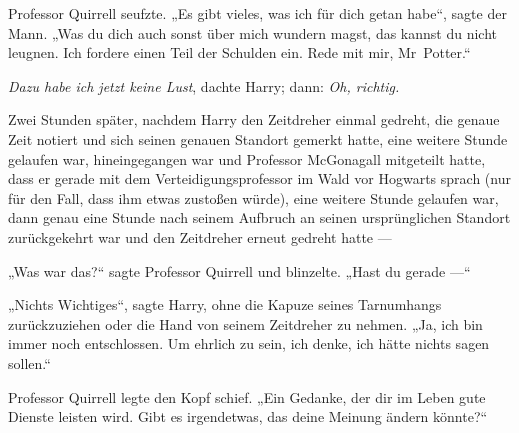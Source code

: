 Professor Quirrell seufzte.
„Es gibt vieles, was ich für dich getan habe“, sagte der Mann.
„Was du dich auch sonst über mich wundern magst, das kannst du nicht leugnen. Ich fordere einen Teil der Schulden ein. Rede mit mir, Mr~Potter.“

\emph{Dazu habe ich jetzt keine Lust}, dachte Harry; dann: \emph{Oh, richtig.}

\later

Zwei Stunden später, nachdem Harry den Zeitdreher einmal gedreht, die genaue Zeit notiert und sich seinen genauen Standort gemerkt hatte, eine weitere Stunde gelaufen war, hineingegangen war und Professor McGonagall mitgeteilt hatte, dass er gerade mit dem Verteidigungsprofessor im Wald vor Hogwarts sprach (nur für den Fall, dass ihm etwas zustoßen würde), eine weitere Stunde gelaufen war, dann genau eine Stunde nach seinem Aufbruch an seinen ursprünglichen Standort zurückgekehrt war und den Zeitdreher erneut gedreht hatte —

\later

„Was war das?“ sagte Professor Quirrell und blinzelte.
„Hast du gerade —“

„Nichts Wichtiges“, sagte Harry, ohne die Kapuze seines Tarnumhangs zurückzuziehen oder die Hand von seinem Zeitdreher zu nehmen.
„Ja, ich bin immer noch entschlossen. Um ehrlich zu sein, ich denke, ich hätte nichts sagen sollen.“

Professor Quirrell legte den Kopf schief.
„Ein Gedanke, der dir im Leben gute Dienste leisten wird. Gibt es irgendetwas, das deine Meinung ändern könnte?“

